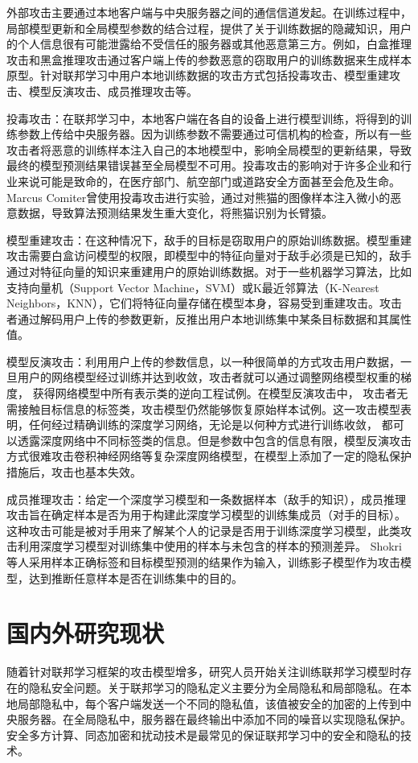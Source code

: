 外部攻击主要通过本地客户端与中央服务器之间的通信信道发起。在训练过程中，局部模型更新和全局模型参数的结合过程，提供了关于训练数据的隐藏知识，用户的个人信息很有可能泄露给不受信任的服务器或其他恶意第三方。例如，白盒推理攻击和黑盒推理攻击通过客户端上传的参数恶意的窃取用户的训练数据来生成样本原型。针对联邦学习中用户本地训练数据的攻击方式包括投毒攻击、模型重建攻击、模型反演攻击、成员推理攻击等。

投毒攻击：在联邦学习中，本地客户端在各自的设备上进行模型训练，将得到的训练参数上传给中央服务器。因为训练参数不需要通过可信机构的检查，所以有一些攻击者将恶意的训练样本注入自己的本地模型中，影响全局模型的更新结果，导致最终的模型预测结果错误甚至全局模型不可用。投毒攻击的影响对于许多企业和行业来说可能是致命的，在医疗部门、航空部门或道路安全方面甚至会危及生命。Marcus Comiter曾使用投毒攻击进行实验，通过对熊猫的图像样本注入微小的恶意数据，导致算法预测结果发生重大变化，将熊猫识别为长臂猿。

模型重建攻击：在这种情况下，敌手的目标是窃取用户的原始训练数据。模型重建攻击需要白盒访问模型的权限，即模型中的特征向量对于敌手必须是已知的，敌手通过对特征向量的知识来重建用户的原始训练数据。对于一些机器学习算法，比如支持向量机（Support Vector Machine，SVM）或K最近邻算法（K-Nearest Neighbors，KNN），它们将特征向量存储在模型本身，容易受到重建攻击。攻击者通过解码用户上传的参数更新，反推出用户本地训练集中某条目标数据和其属性值。

模型反演攻击：利用用户上传的参数信息，以一种很简单的方式攻击用户数据，一旦用户的网络模型经过训练并达到收敛，攻击者就可以通过调整网络模型权重的梯度， 获得网络模型中所有表示类的逆向工程试例。在模型反演攻击中， 攻击者无需接触目标信息的标签类，攻击模型仍然能够恢复原始样本试例。这一攻击模型表明，任何经过精确训练的深度学习网络，无论是以何种方式进行训练收敛， 都可以透露深度网络中不同标签类的信息。但是参数中包含的信息有限，模型反演攻击方式很难攻击卷积神经网络等复杂深度网络模型，在模型上添加了一定的隐私保护措施后，攻击也基本失效。

成员推理攻击：给定一个深度学习模型和一条数据样本（敌手的知识），成员推理攻击旨在确定样本是否为用于构建此深度学习模型的训练集成员（对手的目标）。这种攻击可能是被对手用来了解某个人的记录是否用于训练深度学习模型，此类攻击利用深度学习模型对训练集中使用的样本与未包含的样本的预测差异。 Shokri 等人采用样本正确标签和目标模型预测的结果作为输入，训练影子模型作为攻击模型，达到推断任意样本是否在训练集中的目的。

\section{国内外研究现状}
随着针对联邦学习框架的攻击模型增多，研究人员开始关注训练联邦学习模型时存在的隐私安全问题。关于联邦学习的隐私定义主要分为全局隐私和局部隐私。在本地局部隐私中，每个客户端发送一个不同的隐私值，该值被安全的加密的上传到中央服务器。在全局隐私中，服务器在最终输出中添加不同的噪音以实现隐私保护。安全多方计算、同态加密和扰动技术是最常见的保证联邦学习中的安全和隐私的技术。

